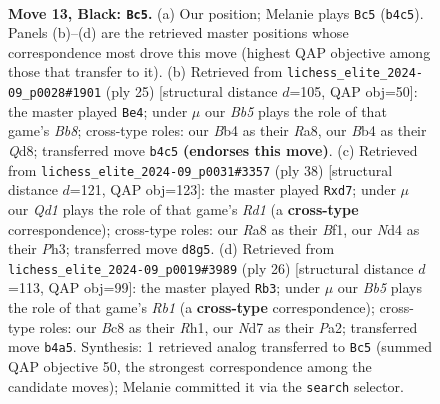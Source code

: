 \documentclass[11pt]{article}
\begin{document}
\clearpage

\begin{figure}[p]\centering
\begin{subfigure}{0.46\textwidth}\centering
\resizebox{\linewidth}{!}{%
\newchessgame
\chessboard[
  setfen={r1bqk3/pp1n1pp1/4p3/3pP3/Qb1n1P1r/P7/1P1N2PP/R1B1K1NR b KQq - 0 13},
  showmover=false,
  pgfstyle=straightmove, color=movearrow, markmove={b4-c5}
]}
\caption{}
\end{subfigure}\hfill
\begin{subfigure}{0.46\textwidth}\centering
\resizebox{\linewidth}{!}{%
\newchessgame
\chessboard[
  setfen={r2qkb1r/1Qpn1ppp/2N1p3/8/2pP4/6P1/PP2PP1P/RbB1K2R b KQk - 3 13},
  showmover=false,
  pgfstyle=straightmove, color=movearrow, markmove={b1-e4}
]}
\caption{}
\end{subfigure}
\\[4pt]
\begin{subfigure}{0.46\textwidth}\centering
\resizebox{\linewidth}{!}{%
\newchessgame
\chessboard[
  setfen={r3k2r/pp1n1pp1/2b1p3/q1B1Qn1p/2P5/2N4P/PP4P1/3RKB1R w Kkq - 7 20},
  showmover=false,
  pgfstyle=straightmove, color=movearrow, markmove={d1-d7}
]}
\caption{}
\end{subfigure}\hfill
\begin{subfigure}{0.46\textwidth}\centering
\resizebox{\linewidth}{!}{%
\newchessgame
\chessboard[
  setfen={r1b1k2r/1p1n1ppp/p3p3/3pP3/Bb1B1P2/q1N5/P1PQ2PP/1R2K2R w Kkq - 2 14},
  showmover=false,
  pgfstyle=straightmove, color=movearrow, markmove={b1-b3}
]}
\caption{}
\end{subfigure}
\caption{\textbf{Move 13, Black: \texttt{Bc5}.} (a) Our position; Melanie plays \texttt{Bc5} (\texttt{b4c5}). Panels (b)--(d) are the retrieved master positions whose correspondence most drove this move (highest QAP objective among those that transfer to it). (b) Retrieved from \texttt{lichess\_elite\_2024-09\_p0028\#1901} (ply 25) [structural distance $d$=105, QAP obj=50]: the master played \texttt{Be4}; under $\mu$ our \emph{Bb5} plays the role of that game's \emph{Bb8}; cross-type roles: our \emph{B}b4 as their \emph{R}a8, our \emph{B}b4 as their \emph{Q}d8; transferred move \texttt{b4c5} \textbf{(endorses this move)}. (c) Retrieved from \texttt{lichess\_elite\_2024-09\_p0031\#3357} (ply 38) [structural distance $d$=121, QAP obj=123]: the master played \texttt{Rxd7}; under $\mu$ our \emph{Qd1} plays the role of that game's \emph{Rd1} (a \textbf{cross-type} correspondence); cross-type roles: our \emph{R}a8 as their \emph{B}f1, our \emph{N}d4 as their \emph{P}h3; transferred move \texttt{d8g5}. (d) Retrieved from \texttt{lichess\_elite\_2024-09\_p0019\#3989} (ply 26) [structural distance $d$=113, QAP obj=99]: the master played \texttt{Rb3}; under $\mu$ our \emph{Bb5} plays the role of that game's \emph{Rb1} (a \textbf{cross-type} correspondence); cross-type roles: our \emph{B}c8 as their \emph{R}h1, our \emph{N}d7 as their \emph{P}a2; transferred move \texttt{b4a5}. Synthesis: 1 retrieved analog transferred to \texttt{Bc5} (summed QAP objective 50, the strongest correspondence among the candidate moves); Melanie committed it via the \texttt{search} selector.}
\label{fig:thought-m25}
\end{figure}
\end{document}
